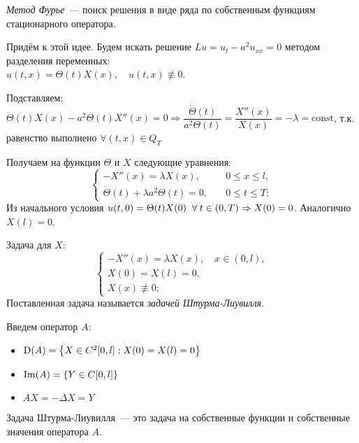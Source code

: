 {\it Метод Фурье}~--- поиск решения в виде ряда по собственным функциям стационарного оператора.

Придём к этой идее. Будем искать решение $Lu = u_t - a^2u_{xx} = 0$ методом разделения переменных: \\ $u(t,x) = \Theta(t) X(x), \quad u(t,x) \not\equiv 0$.

Подставляем: $\dot{\Theta}(t) X(x) - a^2\Theta(t) X''(x) = 0 \Rightarrow \dfrac{\dot{\Theta}(t)}{a^2\Theta(t)} = \dfrac{X''(x)}{X(x)} = -\lambda = \text{const}$, т.к. равенство выполнено $\forall (t,x) \in Q_T$

Получаем на функции $\Theta$ и $X$ следующие уравнения:
\begin{equation*}
	\begin{cases}
		-X''(x) = \lambda X(x), \quad & 0 \leq x \leq l, \\
		\dot{\Theta}(t) + \lambda a^2 \Theta(t) = 0, \quad & 0 \leq t \leq T;
	\end{cases}
\end{equation*}
Из начального условия $u(t,0) = \Theta(t)X(0) \;\;\forall\: t \in (0,T) \Rightarrow X(0) = 0$. Аналогично $X(l) = 0$.

Задача для $X$:
\begin{equation}
	\begin{cases}
		-X''(x) = \lambda X(x), \quad x \in (0,l), \\
		X(0) = X(l) = 0, \\
		X(x) \not\equiv 0;
	\end{cases}
\end{equation}
Поставленная задача называется {\it задачей Штурма-Лиувилля}.

Введем оператор $A$:
\begin{itemize}
	\item $\mathrm{D}(A) = \left\{X \in C^2[0,l] : X(0) = X(l) = 0\right\}$
	\item $\mathrm{Im}(A) = \left\{Y \in C[0,l]\right\}$
	\item $AX = -\Delta X = Y$
\end{itemize}

Задача Штурма-Лиувилля~--- это задача на собственные функции и собственные значения оператора $A$.

